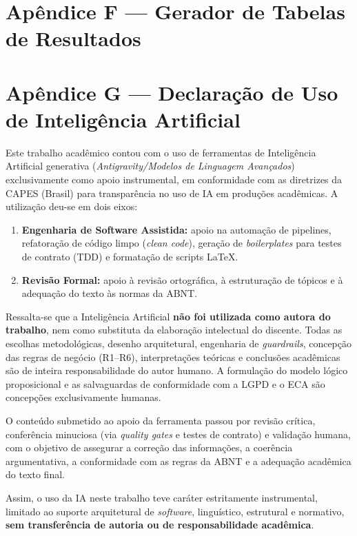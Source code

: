 \documentclass[11pt]{article}
\let\Oldlatex\LaTeX
\renewcommand{\LaTeX}{\textrm{\Oldlatex}}
\begin{document}
\section*{Apêndice F --- Gerador de Tabelas de Resultados}


\section*{Apêndice G --- Declaração de Uso de Inteligência Artificial}

Este trabalho acadêmico contou com o uso de ferramentas de Inteligência Artificial generativa (\textit{Antigravity/Modelos de Linguagem Avançados}) exclusivamente como apoio instrumental, em conformidade com as diretrizes da CAPES (Brasil) para transparência no uso de IA em produções acadêmicas. A utilização deu-se em dois eixos:

\begin{enumerate}
  \item \textbf{Engenharia de Software Assistida:} apoio na automação de pipelines, refatoração de código limpo (\textit{clean code}), geração de \textit{boilerplates} para testes de contrato (TDD) e formatação de scripts \LaTeX.
  \item \textbf{Revisão Formal:} apoio à revisão ortográfica, à estruturação de tópicos e à adequação do texto às normas da ABNT.
\end{enumerate}

Ressalta-se que a Inteligência Artificial \textbf{não foi utilizada como autora do trabalho}, nem como substituta da elaboração intelectual do discente. Todas as escolhas metodológicas, desenho arquitetural, engenharia de \textit{guardrails}, concepção das regras de negócio (R1--R6), interpretações teóricas e conclusões acadêmicas são de inteira responsabilidade do autor humano. A formulação do modelo lógico proposicional e as salvaguardas de conformidade com a LGPD e o ECA são concepções exclusivamente humanas.

O conteúdo submetido ao apoio da ferramenta passou por revisão crítica, conferência minuciosa (via \textit{quality gates} e testes de contrato) e validação humana, com o objetivo de assegurar a correção das informações, a coerência argumentativa, a conformidade com as regras da ABNT e a adequação acadêmica do texto final.

Assim, o uso da IA neste trabalho teve caráter estritamente instrumental, limitado ao suporte arquitetural de \textit{software}, linguístico, estrutural e normativo, \textbf{sem transferência de autoria ou de responsabilidade acadêmica}.
\end{document}
